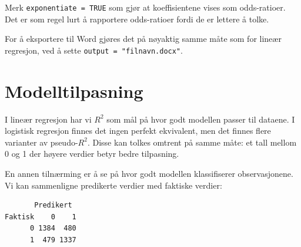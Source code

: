 \documentclass[
  norsk,
  letterpaper,
  DIV=11,
  numbers=noendperiod]{scrreprt}
\newenvironment{Shaded}{\begin{snugshade}}{\end{snugshade}}
\newcommand{\AttributeTok}[1]{\textcolor[rgb]{0.40,0.45,0.13}{#1}}
\newcommand{\DecValTok}[1]{\textcolor[rgb]{0.68,0.00,0.00}{#1}}
\newcommand{\FloatTok}[1]{\textcolor[rgb]{0.68,0.00,0.00}{#1}}
\newcommand{\FunctionTok}[1]{\textcolor[rgb]{0.28,0.35,0.67}{#1}}
\newcommand{\NormalTok}[1]{\textcolor[rgb]{0.00,0.23,0.31}{#1}}
\newcommand{\OtherTok}[1]{\textcolor[rgb]{0.00,0.23,0.31}{#1}}
\newcommand{\SpecialCharTok}[1]{\textcolor[rgb]{0.37,0.37,0.37}{#1}}
\newcommand{\StringTok}[1]{\textcolor[rgb]{0.13,0.47,0.30}{#1}}
\theoremstyle{definition}
\theoremstyle{remark}
\begin{document}
Merk \texttt{exponentiate\ =\ TRUE} som gjør at koeffisientene vises som
odds-ratioer. Det er som regel lurt å rapportere odds-ratioer fordi de
er lettere å tolke.

For å eksportere til Word gjøres det på nøyaktig samme måte som for
lineær regresjon, ved å sette \texttt{output\ =\ "filnavn.docx"}.

\section{Modelltilpasning}\label{modelltilpasning}

I lineær regresjon har vi \(R^2\) som mål på hvor godt modellen passer
til dataene. I logistisk regresjon finnes det ingen perfekt ekvivalent,
men det finnes flere varianter av pseudo-\(R^2\). Disse kan tolkes
omtrent på samme måte: et tall mellom 0 og 1 der høyere verdier betyr
bedre tilpasning.

En annen tilnærming er å se på hvor godt modellen klassifiserer
observasjonene. Vi kan sammenligne predikerte verdier med faktiske
verdier:

\begin{Shaded}
\end{Shaded}

\begin{verbatim}
       Predikert
Faktisk    0    1
      0 1384  480
      1  479 1337
\end{verbatim}
\end{document}
